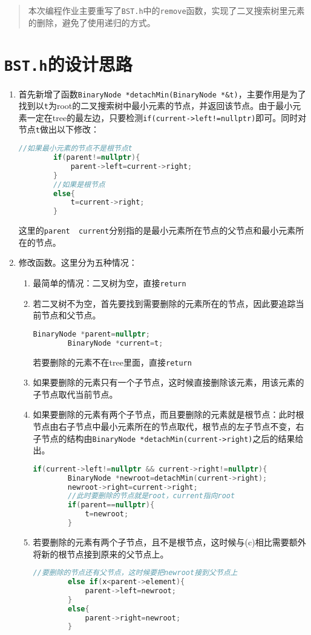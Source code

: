 \documentclass[UTF8]{ctexart}
\begin{document}
\pagestyle{fancy}
\fancyhead{}
\rhead{\today}
\begin{abstract}
	本次编程作业主要重写了\texttt{BST.h}中的\texttt{remove}函数，实现了二叉搜索树里元素的删除，避免了使用递归的方式。
\end{abstract}
\section{\texttt{BST.h}的设计思路}
\begin{enumerate}
	\item
	首先新增了函数\texttt{BinaryNode *detachMin(BinaryNode *\&t)}，主要作用是为了找到以\texttt{t}为root的二叉搜索树中最小元素的节点，并返回该节点。由于最小元素一定在tree的最左边，只要检测\texttt{if(current->left!=nullptr)}即可。同时对节点\lstinline|t|做出以下修改：
	\begin{lstlisting}[language=C++]
		//如果最小元素的节点不是根节点t
		if(parent!=nullptr){
			parent->left=current->right;
		}
		//如果是根节点
		else{
			t=current->right;
		}
	\end{lstlisting}
	这里的\texttt{parent \ current}分别指的是最小元素所在节点的父节点和最小元素所在的节点。
	\item 
	修改函数。这里分为五种情况：
	\begin{enumerate}
		\item 最简单的情况：二叉树为空，直接\texttt{return}
		\item 若二叉树不为空，首先要找到需要删除的元素所在的节点，因此要追踪当前节点和父节点。
		\begin{lstlisting}[language=C++]
		BinaryNode *parent=nullptr;
		BinaryNode *current=t;
		\end{lstlisting}
		若要删除的元素不在tree里面，直接\texttt{return}
		\item 如果要删除的元素只有一个子节点，这时候直接删除该元素，用该元素的子节点取代当前节点。
		\item 如果要删除的元素有两个子节点，而且要删除的元素就是根节点：此时根节点由右子节点中最小元素所在的节点取代，根节点的左子节点不变，右子节点的结构由\texttt{BinaryNode *detachMin(current->right)}之后的结果给出。
		\begin{lstlisting}[language=C++]
		if(current->left!=nullptr && current->right!=nullptr){
		BinaryNode *newroot=detachMin(current->right);
		newroot->right=current->right;
		//此时要删除的节点就是root，current指向root
		if(parent==nullptr){
			t=newroot;
		}
		\end{lstlisting}
		\item 若要删除的元素有两个子节点，且不是根节点，这时候与(c)相比需要额外将新的根节点接到原来的父节点上。
		\begin{lstlisting}[language=C++]
		//要删除的节点还有父节点，这时候要把newroot接到父节点上
		else if(x<parent->element){
			parent->left=newroot;
		}
		else{
			parent->right=newroot;
		}
		\end{lstlisting}
	\end{enumerate}
\end{enumerate}
\end{document}
